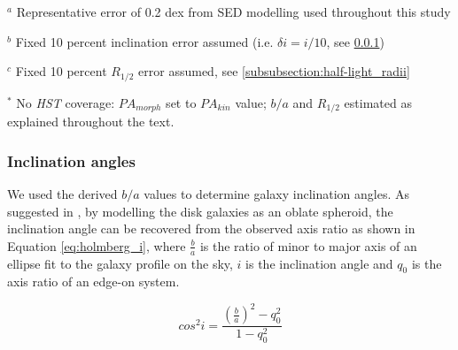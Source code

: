\documentclass[fleqn,usenatbib]{mnras}
\begin{document}
\begin{table*}
\begin{threeparttable}
\begin{tablenotes}
      \small
      \item $^{a}$ Representative error of 0.2 dex from SED modelling used throughout this study
      \item $^{b}$ Fixed 10 percent inclination error assumed (i.e. $\delta i = i / 10$, see \protect\cref{subsubsection:inclination_angle})
      \item $^{c}$ Fixed 10 percent $R_{1/2}$ error assumed, see \protect\cref{subsubsection:half-light_radii}
      \item $^{*}$ No {\em HST} coverage: $PA_{morph}$ set to $PA_{kin}$ value; $b/a$ and $R_{1/2}$ estimated as explained throughout the text.
    \end{tablenotes}
  \end{threeparttable}
  \end{table*}


\subsubsection{Inclination angles}\label{subsubsection:inclination_angle}
We used the derived $b/a$ values to determine galaxy inclination angles.
As suggested in \cite{Holmberg1958}, by modelling the disk galaxies as an oblate spheroid, the inclination angle can be recovered from the observed axis ratio as shown in Equation \ref{eq:holmberg_i}, where $\frac{b}{a}$ is the ratio of minor to major axis of an ellipse fit to the galaxy profile on the sky, $i$ is the inclination angle and $q_{0}$ is the axis ratio of an edge-on system.

\begin{equation}\label{eq:holmberg_i}
   cos^{2}i = \frac{\left(\frac{b}{a}\right)^{2} - q_{0}^{2}}{1 - q_{0}^{2}}
\end{equation}
\end{document}
